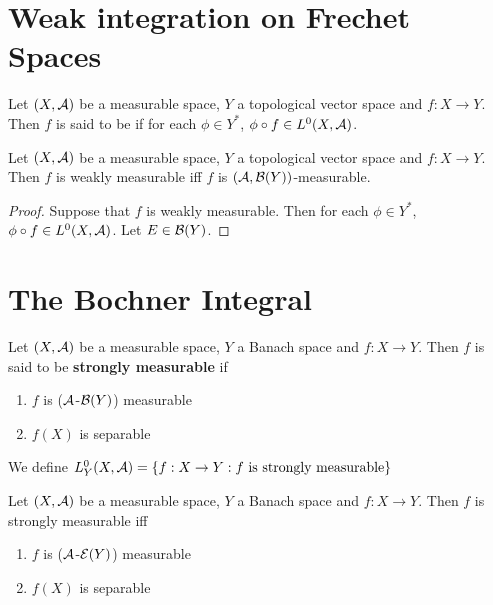 \documentclass{book}
\begin{document}
\newpage
\section{Weak integration on Frechet Spaces}

\begin{defn}
	Let $(X, \mathcal{A})$ be a measurable space, $Y$ a topological vector space and $f:X \rightarrow Y$. Then $f$ is said to be  if for each $\phi \in Y^*$, $\phi \circ f \in L^0(X, \mathcal{A})$. 
\end{defn}

\begin{ex}
	Let $(X, \mathcal{A})$ be a measurable space, $Y$ a topological vector space and $f:X \rightarrow Y$. Then $f$ is weakly measurable iff $f$ is $(\mathcal{A}, \mathcal{B}(Y))$-measurable.
\end{ex}

\begin{proof}
	Suppose that $f$ is weakly measurable. Then for each $\phi \in Y^*$, $\phi \circ f \in L^0(X, \mathcal{A})$. Let $E \in \mathcal{B}(Y)$. 
\end{proof}
	
	
	
	
	
	
	
	
	
	
	
	
	
	
	
	
	
	
	
	
	
	
	
	
	
	\newpage
	\section{The Bochner Integral}
	
	\begin{defn}
		Let $(X, \mathcal{A})$ be a measurable space, $Y$ a Banach space and $f:X \rightarrow Y$. Then $f$ is said to be \textbf{strongly measurable} if 
		\begin{enumerate}
			\item $f$ is ($\mathcal{A}$-$\mathcal{B}(Y)$) measurable
			\item $f(X)$ is separable
		\end{enumerate}
		We define $L^0_Y(X, \mathcal{A}) = \{f:X \rightarrow Y: f \text{ is strongly measurable}\}$
	\end{defn}

	\begin{ex}
		Let $(X, \mathcal{A})$ be a measurable space, $Y$ a Banach space and $f:X \rightarrow Y$. Then $f$ is strongly measurable iff 
		\begin{enumerate}
			\item $f$ is ($\mathcal{A}$-$\mathcal{E}(Y)$) measurable
			\item $f(X)$ is separable
		\end{enumerate}
	\end{ex}
\end{document}
